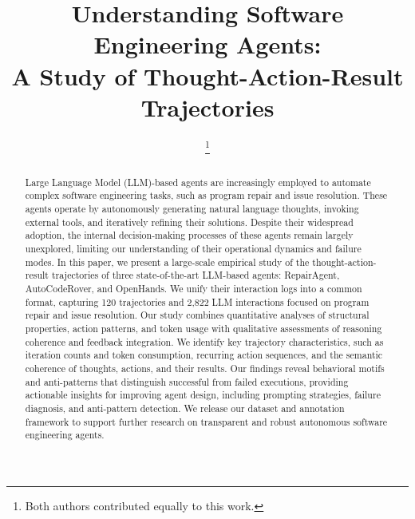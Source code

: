 \documentclass[conference,10pt]{IEEEtran}
\theoremstyle{definition}        %
\newcommand{\ra}{Repair\-Agent}
\newcommand{\oh}{Open\-Hands}
\newcommand{\acr}{Auto\-Code\-Rover}
\begin{document}
\author{
	\and
	\thanks{Both authors contributed equally to this work.}
}

\title{Understanding Software Engineering Agents:\\ A Study of Thought-Action-Result Trajectories}

\maketitle

\pagestyle{plain} %


\begin{abstract}
Large Language Model (LLM)-based agents are increasingly employed to automate complex software engineering tasks, such as program repair and issue resolution. These agents operate by autonomously generating natural language thoughts, invoking external tools, and iteratively refining their solutions. Despite their widespread adoption, the internal decision-making processes of these agents remain largely unexplored, limiting our understanding of their operational dynamics and failure modes. In this paper, we present a large-scale empirical study of the thought-action-result trajectories of three state-of-the-art LLM-based agents: \ra{}, \acr{}, and \oh{}. We unify their interaction logs into a common format, capturing 120 trajectories and 2,822 LLM interactions focused on program repair and issue resolution. Our study combines quantitative analyses of structural properties, action patterns, and token usage with qualitative assessments of reasoning coherence and feedback integration. We identify key trajectory characteristics, such as iteration counts and token consumption, recurring action sequences, and the semantic coherence of thoughts, actions, and their results. Our findings reveal behavioral motifs and anti-patterns that distinguish successful from failed executions, providing actionable insights for improving agent design, including prompting strategies, failure diagnosis, and anti-pattern detection. We release our dataset and annotation framework to support further research on transparent and robust autonomous software engineering agents.
\end{abstract}
\end{document}

